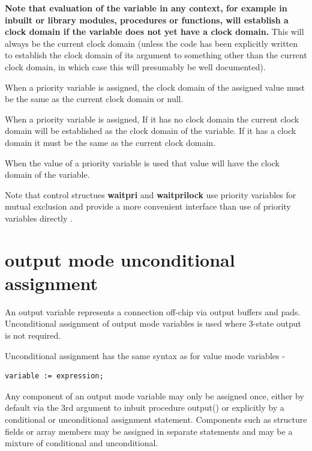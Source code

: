         {\bf Note that evaluation of the variable in any context, for example
        in inbuilt or library modules, procedures or functions, will establish
        a clock domain if the variable does not yet have a clock domain.}
        This will always be the current clock domain (unless the code has
        been explicitly written to establish the clock domain of its argument
        to something other than the current clock domain, in which case
        this will presumably be well documented).
        
        When a priority variable is assigned, the clock domain of the assigned
        value must be the same as the current clock domain or null.
        
        When a priority variable is assigned, If it has no clock domain the
        current clock domain will be established as the clock domain of the
        variable. If it has a clock domain it must be the same as the current
        clock domain.
        
        When the value of a priority variable is used that value will have the
        clock domain of the variable.
        
        Note that control structues {\bf waitpri} and {\bf waitprilock} use
        priority variables for mutual exclusion and provide a more convenient
        interface than use of priority variables directly
        .
        
        



    \section{output mode unconditional assignment}\label{sec:outputiass}
    
        An output variable represents a connection off-chip via output buffers and
        pads. Unconditional assignment of output mode variables is used where
        3-state output is not required.

        Unconditional assignment has the same syntax as for value mode variables -
        \begin{lstlisting}[gobble=8, language=threepl]
               variable := expression;
        \end{lstlisting}
        
        Any component of an output mode variable may only be assigned once,
        either by default via the 3rd argument to inbuit procedure output() or
        explicitly by a conditional or unconditional assignment statement.
        Components such as structure fields or array members may be assigned
        in separate statements and may be a mixture of conditional and
        unconditional.
                
